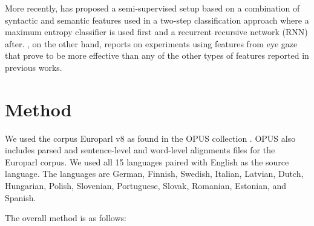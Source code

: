 \documentclass[10pt, a4paper]{article} \usepackage{lrec} \usepackage{multibib}
\begin{document}
More recently,  \cite{Loaiciga2017itrnn} has proposed a semi-supervised setup based on a
combination of syntactic and semantic features used in a two-step classification
approach where a maximum entropy classifier is used first and a recurrent
recursive network (RNN) after. \cite{yaneva-etal-2018-classifying}, on the other
hand, reports on experiments using features from eye gaze that prove to be more
effective than any of the other types of features reported in previous works.




\section{Method}

We used the corpus Europarl \cite{Koehn2005} v8 as found in the OPUS collection
\cite{TIEDEMANN12.463}. OPUS also includes parsed and sentence-level and
word-level alignments files for the Europarl corpus. We used all 15 languages
paired with English as the source language. The languages are German, Finnish, Swedish, Italian, Latvian, Dutch, Hungarian, Polish, Slovenian, Portuguese, Slovak, Romanian, Estonian, and Spanish.  

The overall method is as follows:
\end{document}
